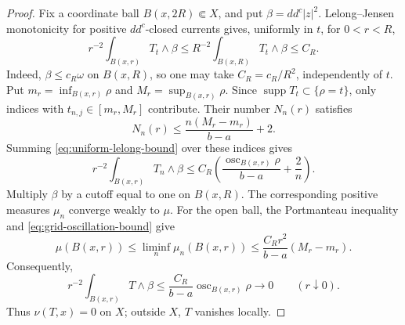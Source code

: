 \documentclass[11pt]{amsart}
\theoremstyle{definition}
\theoremstyle{remark}
\numberwithin{equation}{section}
\newcommand{\ddc}{dd^c}
\newcommand{\supp}{\operatorname{supp}}
\begin{document}
\begin{proof}
Fix a coordinate ball $B(x,2R)\Subset X$, and put
$\beta=\ddc|z|^2$. Lelong--Jensen monotonicity for positive
$dd^c$-closed currents \cite[Appendix~B, (B.1)--(B.2)]{DNS22} gives,
uniformly in $t$, for $0<r<R$,
\begin{equation}\label{eq:uniform-lelong-bound}
 r^{-2}\int_{B(x,r)}T_t\wedge\beta
 \le R^{-2}\int_{B(x,R)}T_t\wedge\beta\le C_R.
\end{equation}
Indeed, $\beta\le c_R\omega$ on $B(x,R)$, so one may take
$C_R=c_R/R^2$, independently of $t$. Put
$m_r=\inf_{B(x,r)}\rho$ and $M_r=\sup_{B(x,r)}\rho$.
Since $\supp T_t\subset\{\rho=t\}$, only indices with
$t_{n,j}\in[m_r,M_r]$ contribute. Their number $N_n(r)$ satisfies
\[
 N_n(r)\le\frac{n(M_r-m_r)}{b-a}+2.
\]
Summing \eqref{eq:uniform-lelong-bound} over these indices gives
\begin{equation}\label{eq:grid-oscillation-bound}
 r^{-2}\int_{B(x,r)}T_n\wedge\beta
 \le C_R\left(\frac{\operatorname{osc}_{B(x,r)}\rho}{b-a}
                  +\frac2n\right).
\end{equation}
Multiply $\beta$ by a cutoff equal to one on $B(x,R)$. The
corresponding positive measures $\mu_n$ converge weakly to $\mu$.
For the open ball, the Portmanteau inequality and
\eqref{eq:grid-oscillation-bound} give
\[
 \mu(B(x,r))\le\liminf_n\mu_n(B(x,r))
 \le\frac{C_Rr^2}{b-a}(M_r-m_r).
\]
Consequently,
\begin{equation}\label{eq:limit-oscillation-bound}
 r^{-2}\int_{B(x,r)}T\wedge\beta
 \le\frac{C_R}{b-a}\operatorname{osc}_{B(x,r)}\rho
 \longrightarrow0\qquad(r\downarrow0).
\end{equation}
Thus $\nu(T,x)=0$ on $X$; outside $X$, $T$ vanishes locally.
\end{proof}
\end{document}
